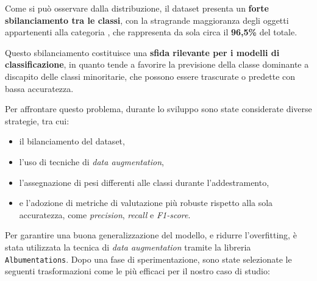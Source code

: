 \documentclass[minted, draw]{../tex/hebdomon}
\begin{document}
Come si può osservare dalla distribuzione, il dataset presenta un \textbf{forte sbilanciamento tra le classi}, con la stragrande maggioranza degli oggetti appartenenti alla categoria , che rappresenta da sola circa il \textbf{96{,}5\%} del totale.

Questo sbilanciamento costituisce una \textbf{sfida rilevante per i modelli di classificazione}, in quanto tende a favorire la previsione della classe dominante a discapito delle classi minoritarie, che possono essere trascurate o predette con bassa accuratezza.

Per affrontare questo problema, durante lo sviluppo sono state considerate diverse strategie, tra cui:
\begin{itemize}
   \item il bilanciamento del dataset,
   \item l’uso di tecniche di \textit{data augmentation},
   \item l’assegnazione di pesi differenti alle classi durante l’addestramento,
   \item e l’adozione di metriche di valutazione più robuste rispetto alla sola accuratezza, come \textit{precision}, \textit{recall} e \textit{F1-score}.
\end{itemize}



Per garantire una buona generalizzazione del modello, e ridurre l'overfitting, è stata utilizzata la tecnica di \textit{data augmentation} tramite la libreria \texttt{Albumentations}. Dopo una fase di sperimentazione, sono state selezionate le seguenti trasformazioni come le più efficaci per il nostro caso di studio:
\end{document}
